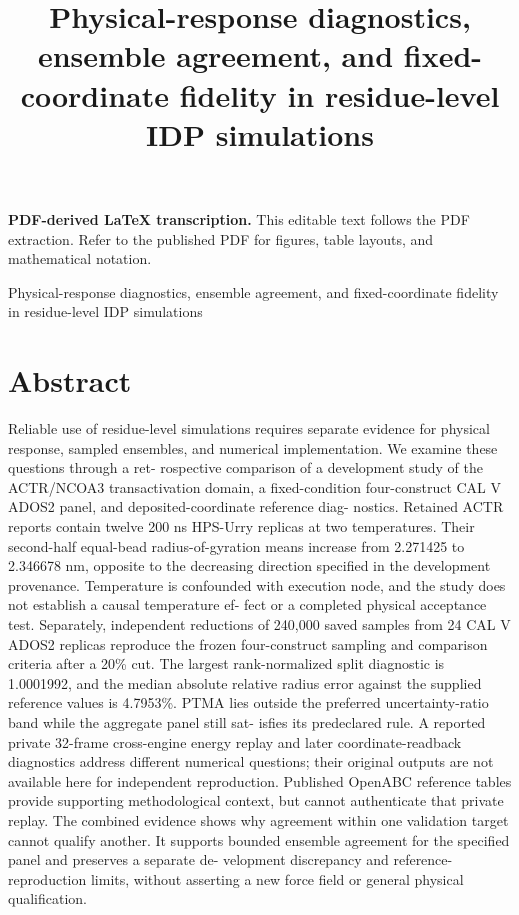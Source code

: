 \documentclass[11pt]{article}
\title{Physical-response diagnostics, ensemble agreement, and fixed-coordinate fidelity in residue-level IDP simulations}
\author{}
\date{}
\begin{document}
\maketitle
\noindent\textbf{PDF-derived LaTeX transcription.} This editable text follows the PDF extraction. Refer to the published PDF for figures, table layouts, and mathematical notation.


Physical-response diagnostics, ensemble agreement, and
fixed-coordinate fidelity in residue-level IDP simulations

\section*{Abstract}

Reliable use of residue-level simulations requires separate evidence for physical response,
sampled ensembles, and numerical implementation. We examine these questions through a ret-
rospective comparison of a development study of the ACTR/NCOA3 transactivation domain,
a fixed-condition four-construct CAL V ADOS2 panel, and deposited-coordinate reference diag-
nostics. Retained ACTR reports contain twelve 200 ns HPS-Urry replicas at two temperatures.
Their second-half equal-bead radius-of-gyration means increase from 2.271425 to 2.346678 nm,
opposite to the decreasing direction specified in the development provenance. Temperature is
confounded with execution node, and the study does not establish a causal temperature ef-
fect or a completed physical acceptance test. Separately, independent reductions of 240,000
saved samples from 24 CAL V ADOS2 replicas reproduce the frozen four-construct sampling and
comparison criteria after a 20\% cut. The largest rank-normalized split diagnostic is 1.0001992,
and the median absolute relative radius error against the supplied reference values is 4.7953\%.
PTMA lies outside the preferred uncertainty-ratio band while the aggregate panel still sat-
isfies its predeclared rule. A reported private 32-frame cross-engine energy replay and later
coordinate-readback diagnostics address different numerical questions; their original outputs
are not available here for independent reproduction. Published OpenABC reference tables
provide supporting methodological context, but cannot authenticate that private replay. The
combined evidence shows why agreement within one validation target cannot qualify another.
It supports bounded ensemble agreement for the specified panel and preserves a separate de-
velopment discrepancy and reference-reproduction limits, without asserting a new force field or
general physical qualification.
\end{document}
